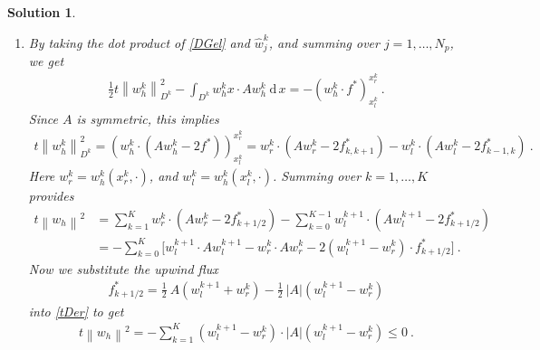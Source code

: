 \documentclass[10pt,letterpaper]{article}
\newcommand{\dtdo}{} %
\newcommand{\dif}[1][]{\mathrm{d} {#1}\,}
\newcommand{\rb}[1]{ \left(  {#1} \right) }
\newcommand{\frb}[1]{ \left(  {#1} \right) }
\newcommand{\norm}[1]{ \left\|  {#1} \right\| }
\newcommand{\sqb}[1]{ \left(  {#1} \right) }
\theoremstyle{break}
\newtheorem{mysolution}{Solution}
\newenvironment{solution}{\begin{mysolution}}{\end{mysolution}}
\begin{document}
\begin{solution}
\begin{enumerate}
\begin{enumerate}
		\item
		By taking the dot product of \eqref{DGel} and $\hat w_j^k$, and summing over $j=1,\ldots,N_p$, we get
		\begin{gather}
			\frac{1}{2}\dtdo{}{t}\norm{w_h^k}_{D^k}^2-\int_{D^k}\dtdo{w_h^k}{x}\cdot A w_h^k\ \dif x
				=-\sqb{w_h^k\cdot f^*}_{x_l^k}^{x_r^k}\ .
		\end{gather}
		Since $A$ is symmetric, this implies
		\begin{gather}
			\dtdo{}{t}\norm{w_h^k}_{D^k}^2=\sqb{w_h^k\cdot \rb{Aw_h^k- 2 f^*}}_{x_l^k}^{x_r^k}
				=w_r^k\cdot \rb{Aw_r^k- 2 f_{k,k+1}^*}-w_l^k\cdot \rb{Aw_l^k- 2 f_{k-1,k}^*}\ .
		\end{gather}
		Here $w_r^k=w_h^k\frb{x_r^k,\cdot}$, and $w_l^k=w_h^k\frb{x_l^k,\cdot}$.
		Summing over $k=1,\ldots,K$ provides
		\begin{align} \label{tDer}
			\dtdo{}{t}\norm{w_h}^2 &=\sum_{k=1}^K w_r^k\cdot \rb{Aw_r^k- 2 f_{k+1/2}^*}
					-\sum_{k=0}^{K-1} w_l^{k+1}\cdot \rb{Aw_l^{k+1}- 2 f_{k+1/2}^*}\\
				&=-\sum_{k=0}^{K}\bigg[w_l^{k+1}\cdot Aw_l^{k+1} -w_r^k\cdot Aw_r^k
					-2\rb{w_l^{k+1}-w_r^k}\cdot f_{k+1/2}^*\bigg]\ .
		\end{align}
		Now we substitute the upwind flux
		\begin{gather}
			f_{k+1/2}^*=\frac{1}{2}\ A\rb{w_l^{k+1}+w_r^k} -\frac{1}{2}\ |A|\rb{w_l^{k+1}-w_r^k}
		\end{gather}
		into \eqref{tDer} to get
		\begin{gather}
			\dtdo{}{t}\norm{w_h}^2
				=-\sum_{k=1}^{K}\rb{w_l^{k+1}-w_r^k}\cdot|A|\rb{w_l^{k+1}-w_r^k}\le 0\ .
		\end{gather}
	\end{enumerate}


\end{enumerate}
\end{solution}
\end{document}

